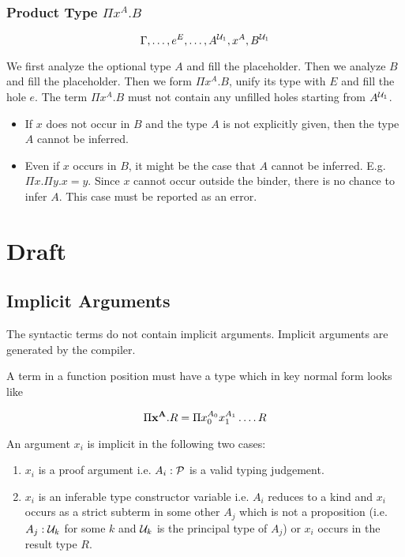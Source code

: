 \subsubsection{Product Type $\Pi x^A. B$}


$$
\Gamma, \ldots, e^E, \ldots, A^{{\cal{U}}_1}, x^A, B^{{\cal{U}}_1}
$$

We first analyze the optional type $A$ and fill the placeholder. Then we analyze
$B$ and fill the placeholder. Then we form $\Pi x^A.B$, unify its type with $E$
and fill the hole $e$. The term $\Pi x^A. B$ must not contain any unfilled holes
starting from $A^{{\cal{U}}_1}$.

\begin{itemize}

\item If $x$ does not occur in $B$ and the type $A$ is not explicitly given,
then the type $A$ cannot be inferred.

\item Even if $x$ occurs in $B$, it might be the case that $A$ cannot be
inferred. E.g. $\Pi x . \Pi y. x = y$. Since $x$ cannot occur outside the binder,
there is no chance to infer $A$. This case must be reported as an error.

\end{itemize}







\section{Draft}

\subsection{Implicit Arguments}

The syntactic terms do not contain implicit arguments. Implicit arguments are
generated by the compiler.

A term in a function position must have a type which in key normal form looks
like

$$
\Pi \mathbf{x}^{\mathbf{A}} . R = \Pi x_0^{A_0} x_1^{A_1} \ldots .\, R
$$

An argument $x_i$ is implicit in the following two cases:

\begin{enumerate}
\item $x_i$ is a proof argument i.e. $A_i : {\cal{P}}$ is a valid typing
  judgement.

\item $x_i$ is an inferable type constructor variable i.e. $A_i$ reduces to a
  kind and $x_i$ occurs as a strict subterm in some other $A_j$ which is not a
  proposition (i.e. $A_j:{\cal{U}}_k$ for some $k$ and ${\cal{U}}_k$ is the principal
  type of $A_j$) or $x_i$ occurs in the result type $R$.
\end{enumerate}

